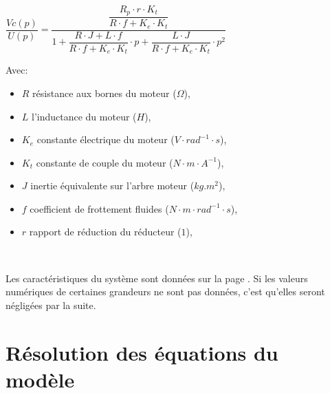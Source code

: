 \begin{center}
 $\dfrac{Vc(p)}{U(p)}=\dfrac{\dfrac{R_p\cdot r\cdot K_t}{R\cdot f +K_e\cdot K_t}}{1+\dfrac{R\cdot J+L\cdot f}{R\cdot f +K_e\cdot K_t}\cdot p+\dfrac{L\cdot J}{R\cdot f +K_e\cdot K_t}\cdot p^2}$
\end{center}

Avec:
\begin{itemize}
 \item $R$ résistance aux bornes du moteur ($\Omega$),
 \item $L$ l'inductance du moteur ($H$),
 \item $K_e$ constante électrique du moteur ($V\cdot rad^{-1}\cdot s$),
 \item $K_t$ constante de couple du moteur ($N\cdot m\cdot A^{-1}$),
 \item $J$ inertie équivalente sur l'arbre moteur ($kg.m^2$),
 \item $f$ coefficient de frottement fluides ($N\cdot m\cdot rad^{-1}\cdot s$),
 \item $r$ rapport de réduction du réducteur ($1$),
\end{itemize}

~\

Les caractéristiques du système sont données sur la page \urlsysteme. Si les valeurs numériques de certaines grandeurs ne sont pas données, c'est qu'elles seront négligées par la suite.






\section{Résolution des équations du modèle}


